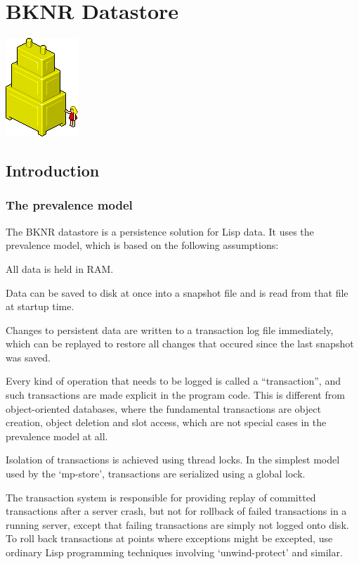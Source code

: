 \chapter{BKNR Datastore}

\vbox{
    \centering
    \includegraphics{datastoreicon}
    \vspace{1cm}}

\section{ Introduction}



\subsection{ The prevalence model}

The BKNR datastore is a persistence solution for Lisp data. It
uses the prevalence model, which is based on the following
assumptions:

All data is held in RAM.

Data can be saved to disk at once into a snapshot file and is read
from that file at startup time.

Changes to persistent data are written to a transaction log file
immediately, which can be replayed to restore all changes that
occured since the last snapshot was saved.

Every kind of operation that needs to be logged is called a
``transaction'', and such transactions are made explicit in the
program code. This is different from object-oriented databases,
where the fundamental transactions are object creation, object
deletion and slot access, which are not special cases in the
prevalence model at all.

Isolation of transactions is achieved using thread locks. In the
simplest model used by the `mp-store', transactions are serialized
using a global lock.

The transaction system is responsible for providing replay of
committed transactions after a server crash, but not for rollback
of failed transactions in a running server, except that failing
transactions are simply not logged onto disk. To roll back
transactions at points where exceptions might be excepted, use
ordinary Lisp programming techniques involving `unwind-protect'
and similar.



